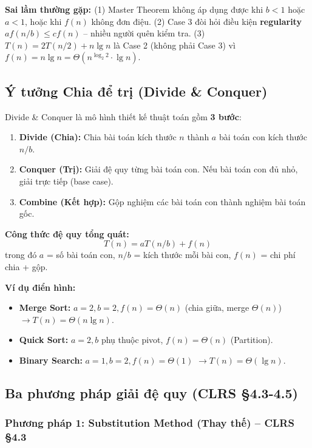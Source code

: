 \documentclass[10pt]{article}
\newcommand{\pitfall}[1]{%
  \begin{tcolorbox}[colback=red!5!white, colframe=red!60!white, leftrule=3pt,
    toprule=0pt, bottomrule=0pt, rightrule=0pt,
    boxsep=2pt, left=6pt, right=6pt, top=4pt, bottom=4pt]
  \small\textbf{\textcolor{red!70!black}{Sai lầm thường gặp: }}#1
  \end{tcolorbox}}
\begin{document}
\pitfall{(1) Master Theorem không áp dụng được khi $b < 1$ hoặc $a < 1$, hoặc khi $f(n)$ không đơn điệu. (2) Case 3 đòi hỏi điều kiện \textbf{regularity} $af(n/b) \leq cf(n)$ -- nhiều người quên kiểm tra. (3) $T(n) = 2T(n/2) + n\lg n$ là Case 2 (không phải Case 3) vì $f(n) = n\lg n = \Theta(n^{\log_2 2} \cdot \lg n)$.}


\subsection{Ý tưởng Chia để trị (Divide \& Conquer)}\label{y-tuong-dc}

Divide \& Conquer là mô hình thiết kế thuật toán gồm \textbf{3 bước}:

\begin{enumerate}
\item \textbf{Divide (Chia):} Chia bài toán kích thước $n$ thành $a$ bài toán con kích thước $n/b$.
\item \textbf{Conquer (Trị):} Giải đệ quy từng bài toán con. Nếu bài toán con đủ nhỏ, giải trực tiếp (base case).
\item \textbf{Combine (Kết hợp):} Gộp nghiệm các bài toán con thành nghiệm bài toán gốc.
\end{enumerate}

\textbf{Công thức đệ quy tổng quát:}
\[T(n) = aT(n/b) + f(n)\]
trong đó $a$ = số bài toán con, $n/b$ = kích thước mỗi bài con, $f(n)$ = chi phí chia + gộp.

\textbf{Ví dụ điển hình:}
\begin{itemize}
\item \textbf{Merge Sort:} $a=2, b=2, f(n)=\Theta(n)$ (chia giữa, merge $\Theta(n)$) $\to T(n)=\Theta(n\lg n)$.
\item \textbf{Quick Sort:} $a=2, b$ phụ thuộc pivot, $f(n)=\Theta(n)$ (Partition).
\item \textbf{Binary Search:} $a=1, b=2, f(n)=\Theta(1)$ $\to T(n)=\Theta(\lg n)$.
\end{itemize}

\subsection{\texorpdfstring{Ba phương pháp giải đệ quy (CLRS
\S 4.3-4.5)}{Ba phương pháp giải đệ quy (CLRS 4.3-4.5)}}\label{ba-phux1b0ux1a1ng-phuxe1p-giux1ea3i-ux111ux1ec7-quy-clrs-4.3-4.5}

\subsubsection{\texorpdfstring{Phương pháp 1: Substitution Method (Thay
thế) -- CLRS
\S 4.3}{Phương pháp 1: Substitution Method (Thay thế) -- CLRS 4.3}}\label{phux1b0ux1a1ng-phuxe1p-1-substitution-method-thay-thux1ebf-clrs-4.3}
\end{document}
